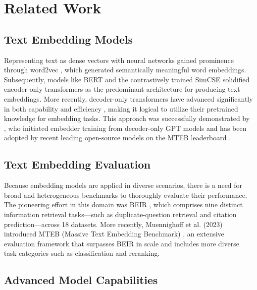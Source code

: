\section{Related Work}
\subsection{Text Embedding Models}

Representing text as dense vectors with neural networks gained prominence through word2vec \citep{mikolov2013distributed}, which generated semantically meaningful word embeddings. Subsequently, models like BERT \citep{devlin2019bert} and the contrastively trained SimCSE \citep{gao2021simcse} solidified encoder-only transformers as the predominant architecture for producing text embeddings. More recently, decoder-only transformers have advanced significantly in both capability and efficiency \citep{brown2020language, gemmateam2024gemmaopenmodelsbased, llama3modelcard, jiang2023mistral}, making it logical to utilize their pretrained knowledge for embedding tasks. This approach was successfully demonstrated by \cite{neelakantan2022}, who initiated embedder training from decoder-only GPT models and has been adopted by recent leading open-source models on the MTEB leaderboard \citep{behnamghader2024llmvec, lee2024nvembed, meng2024sfrembedding}.

\subsection{Text Embedding Evaluation}

Because embedding models are applied in diverse scenarios, there is a need for broad and heterogeneous benchmarks to thoroughly evaluate their performance. The pioneering effort in this domain was BEIR \citep{thakur2021beir}, which comprises nine distinct information retrieval tasks—such as duplicate-question retrieval and citation prediction—across 18 datasets. More recently, Muennighoff et al. (2023) introduced MTEB (Massive Text Embedding Benchmark) \citep{muennighoff2023mteb}, an extensive evaluation framework that surpasses BEIR in scale and includes more diverse task categories such as classification and reranking. 

\subsection{Advanced Model Capabilities}

